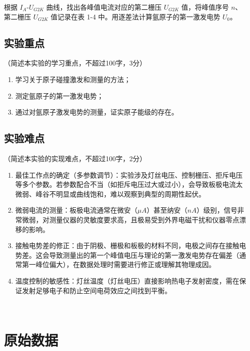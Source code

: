 \documentclass[10pt,a4paper]{ctexart}
\newcommand{\xiaosi}{\fontsize{12pt}{16pt}\selectfont}
\begin{document}
根据 $I_A \text{-} U_{G2K}$ 曲线，找出各峰值电流对应的第二栅压 $U_{G2K}$ 值，将峰值序号 $n$、第二栅压 $U_{G2K}$ 值记录在表 1-4 中。用逐差法计算氩原子的第一激发电势 $U_0$。

    \subsection{实验重点}

    \xiaosi（简述本实验的学习重点，不超过100字，3分）


    \begin{enumerate}   
        \item 学习关于原子碰撞激发和测量的方法；
        \item 测定氩原子的第一激发电势；
        \item 通过对氩原子激发电势的测量，证实原子能级的存在。

    \end{enumerate}  
    
    
    \subsection{实验难点}
    
    \xiaosi（简述本实验的实现难点，不超过100字，2分）

    \begin{enumerate}    
        \item 最佳工作点的确定（多参数调节）：实验涉及灯丝电压、控制栅压、拒斥电压等多个参数。若参数配合不当（如拒斥电压过大或过小），会导致板极电流太微弱、峰谷不明显或曲线饱和，难以观察到典型的周期性起伏。
        \item 微弱电流的测量：板极电流通常在微安（$\mu A$）甚至纳安（$nA$）级别，信号非常微弱，对测量仪器的灵敏度要求高，且极易受到外界电磁干扰和仪器零点漂移的影响。
        \item 接触电势差的修正：由于阴极、栅极和板极的材料不同，电极之间存在接触电势差。这会导致测量出的第一个峰值电压与理论的第一激发电势存在偏差（通常第一峰位偏大），在数据处理时需要进行修正或理解其物理成因。
        \item 温度控制的敏感性：灯丝温度（灯丝电压）直接影响热电子发射密度，需在保证发射足够电子和防止空间电荷效应之间找到平衡。
    \end{enumerate}  \
\newpage

\section{原始数据}
\end{document}
